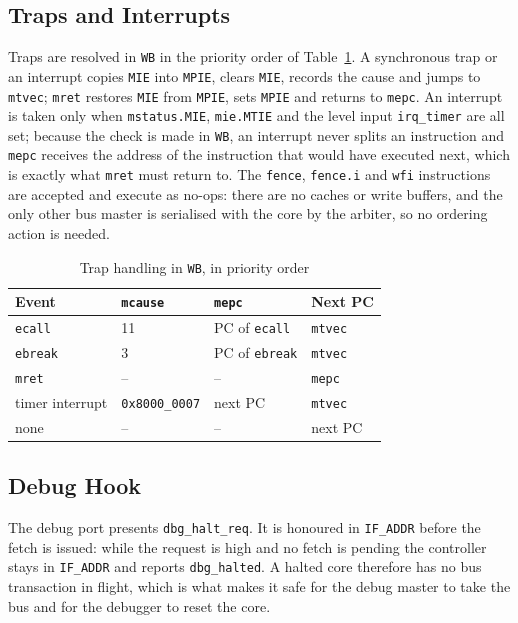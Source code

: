 \documentclass[journal,10pt]{IEEEtran}
\newcommand{\reg}[1]{\texttt{#1}}
\begin{document}
\subsection{Traps and Interrupts}
Traps are resolved in \reg{WB} in the priority order of
Table~\ref{tab:traps}. A synchronous trap or an interrupt copies \reg{MIE}
into \reg{MPIE}, clears \reg{MIE}, records the cause and jumps to
\reg{mtvec}; \reg{mret} restores \reg{MIE} from \reg{MPIE}, sets \reg{MPIE}
and returns to \reg{mepc}. An interrupt is taken only when
\reg{mstatus.MIE}, \reg{mie.MTIE} and the level input \reg{irq\_timer} are
all set; because the check is made in \reg{WB}, an interrupt never splits an
instruction and \reg{mepc} receives the address of the instruction that
would have executed next, which is exactly what \reg{mret} must return to.
The \reg{fence}, \reg{fence.i} and \reg{wfi} instructions are accepted and
execute as no-ops: there are no caches or write buffers, and the only other
bus master is serialised with the core by the arbiter, so no ordering action
is needed.

\begin{table}[t]
\caption{Trap handling in \reg{WB}, in priority order}
\label{tab:traps}
\centering
\footnotesize
\begin{tabular}{@{}llll@{}}
\toprule
Event & \reg{mcause} & \reg{mepc} & Next PC \\
\midrule
\reg{ecall}  & 11 & PC of \reg{ecall} & \reg{mtvec} \\
\reg{ebreak} & 3  & PC of \reg{ebreak} & \reg{mtvec} \\
\reg{mret}   & -- & -- & \reg{mepc} \\
timer interrupt & \reg{0x8000\_0007} & next PC & \reg{mtvec} \\
none & -- & -- & next PC \\
\bottomrule
\end{tabular}
\end{table}

\subsection{Debug Hook}
The debug port presents \reg{dbg\_halt\_req}. It is honoured in
\reg{IF\_ADDR} before the fetch is issued: while the request is high and no
fetch is pending the controller stays in \reg{IF\_ADDR} and reports
\reg{dbg\_halted}. A halted core therefore has no bus transaction in flight,
which is what makes it safe for the debug master to take the bus and for the
debugger to reset the core.
\end{document}
